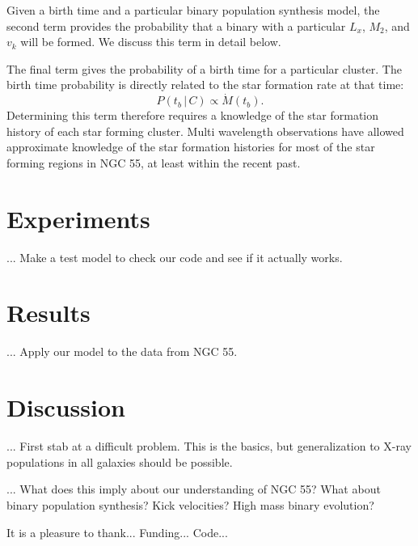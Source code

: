 \documentclass[12pt, preprint]{aastex}
\newcommand{\given}{\,|\,}
\begin{document}
Given a birth time and a particular binary population synthesis model, the second term provides the probability that a binary with a particular $L_x$, $M_2$, and $v_k$ will be formed. We discuss this term in detail below.

The final term gives the probability of a birth time for a particular cluster. The birth time probability is directly related to the star formation rate at that time:
\begin{equation}
P(t_b \given C) \propto \dot{M}(t_b).
\end{equation} 
Determining this term therefore requires a knowledge of the star formation history of each star forming cluster. Multi wavelength observations have allowed approximate knowledge of the star formation histories for most of the star forming regions in NGC 55, at least within the recent past.

 


\section{Experiments}

... Make a test model to check our code and see if it actually works.

\section{Results}

... Apply our model to the data from NGC 55. 

\section{Discussion}

... First stab at a difficult problem. This is the basics, but generalization to X-ray populations in all galaxies should be possible.

... What does this imply about our understanding of NGC 55? What about binary population synthesis? Kick velocities? High mass binary evolution?

\acknowledgements
It is a pleasure to thank...
Funding...
Code...
\end{document}

